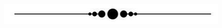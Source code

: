 \documentclass[11pt, a4paper]{article}
\begin{document}
\begin{enumerate}
\vspace{50pt}
	
\begin{figure}[h]
\centering
\includegraphics[scale=0.4]{end}
\end{figure}	
	
	
	
	
	
	
	
	
	
\end{enumerate}
\end{document}
